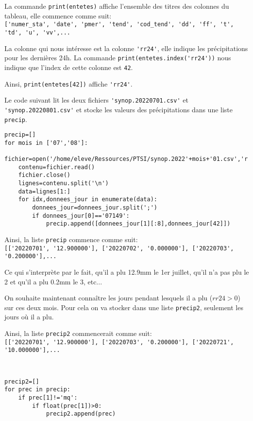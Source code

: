 La commande \verb?print(entetes)? affiche l'ensemble des titres des colonnes du tableau, elle commence comme suit: \\
\verb?['numer_sta', 'date', 'pmer', 'tend', 'cod_tend', 'dd', 'ff', 't', 'td', 'u', 'vv',...?

La colonne qui nous intéresse est la colonne \verb?'rr24'?, elle indique les précipitations pour les dernières 24h. La commande \verb?print(entetes.index('rr24'))? nous indique que l'index de cette colonne est \verb?42?.

Ainsi, \verb?print(entetes[42])? affiche \verb?'rr24'?.

Le code suivant lit les deux fichiers \verb?'synop.20220701.csv'? et \verb?'synop.20220801.csv'? et stocke les valeurs des précipitations dans une liste \verb?precip?.

\begin{verbatim}
precip=[]
for mois in ['07','08']:    
    fichier=open('/home/eleve/Ressources/PTSI/synop.2022'+mois+'01.csv','r')
    contenu=fichier.read()
    fichier.close()
    lignes=contenu.split('\n')
    data=lignes[1:]
    for idx,donnees_jour in enumerate(data):
        donnees_jour=donnees_jour.split(';')
        if donnees_jour[0]=='07149':
            precip.append([donnees_jour[1][:8],donnees_jour[42]])
\end{verbatim}

Ainsi, la liste \verb?precip? commence comme suit:\\
\verb?[['20220701', '12.900000'], ['20220702', '0.000000'], ['20220703', '0.200000'],...?

Ce qui s'interprète par le fait, qu'il a plu 12.9mm le 1er juillet, qu'il n'a pas plu le 2 et qu'il a plu 0.2mm le 3, etc...

On souhaite maintenant connaître les jours pendant lesquels il a plu ($rr24>0$) sur ces deux mois. Pour cela on va stocker dans une liste \verb?precip2?, seulement les jours où il a plu.

Ainsi, la liste \verb?precip2? commencerait comme suit:\\
\verb?[['20220701', '12.900000'], ['20220703', '0.200000'], ['20220721', '10.000000'],...?


\begin{solution}~\ \\
\begin{verbatim}
precip2=[]
for prec in precip:
    if prec[1]!='mq':
        if float(prec[1])>0:
            precip2.append(prec)
\end{verbatim}
\end{solution}

